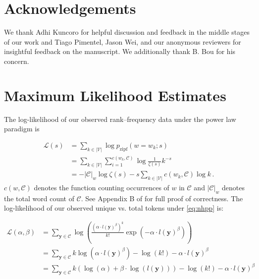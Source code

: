 \documentclass[11pt,a4paper]{article}
\newcommand{\calC}{\mathcal{C}}
\newcommand{\yy}{\mathbf{y}}
\newcommand{\calL}{\mathcal{L}}
\newcommand{\vocab}{\mathcal{V}}
\newcommand{\mathcheck}[1]{#1}
\begin{document}
\section*{Acknowledgements}
We thank Adhi Kuncoro for helpful discussion and feedback in the middle stages of our work and Tiago Pimentel, Jason Wei, and our anonymous reviewers for insightful feedback on the manuscript. We additionally thank B. Bou for his concern.





\clearpage
\newpage
\onecolumn
\appendix
\section{Maximum Likelihood Estimates}\label{app:mle}

The log-likelihood of our observed rank--frequency data under the power law paradigm is 
\mathcheck{
\begin{align}
  \mathcal{L}(s) &= \sum_{k \in |\vocab|} \log p_{\mathrm{zipf}}(w = w_k; s) \\
  &= \sum_{k \in |\vocab|} \sum_{i=1}^{c(w_k,\calC)} \log \frac{1}{\zeta(s)} k^{-s} \\
  & = -|\calC|_w \log \zeta(s) - s \sum_{k \in |\vocab|} c(w_k,\calC) \log k \, . \label{eq:mle}
\end{align}}
\noindent $c(w, \calC)$ denotes the function counting occurrences of $w$ in $\calC$ and $|\calC |_w$ denotes the total word count of $\calC$. See Appendix B of \citet{power_law} for full proof of correctness. The log-likelihood of our observed unique vs. total tokens under \cref{eq:nhpp} is:
\mathcheck{
\begin{align}
    \calL(\alpha, \beta) &= \sum_{\yy \in \calC} \log \left( \frac{(\alpha\cdot l(\yy)^\beta)^k}{k!}\exp(-\alpha\cdot l(\yy)^\beta) \right)\\
    &= \sum_{\yy \in \calC} k \log (\alpha\cdot l(\yy)^\beta) - \log(k!) -\alpha\cdot l(\yy)^\beta \\
    &= \sum_{\yy \in \calC} k \left (\log(\alpha) + \beta\cdot\log (l(\yy)) \right)- \log(k!) -\alpha\cdot l(\yy)^\beta
\end{align}}
\end{document}
